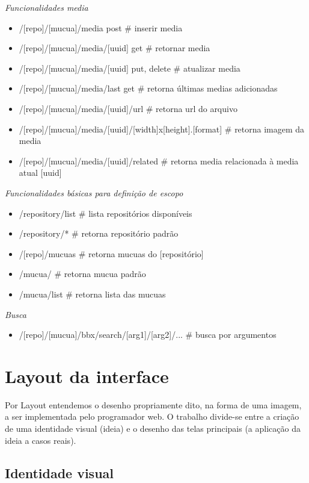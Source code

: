 \begin{itemize}
\emph{Funcionalidades media}
\begin{itemize}
\item /[repo]/[mucua]/media {post}                # inserir media
\item /[repo]/[mucua]/media/[uuid] {get}          # retornar media
\item /[repo]/[mucua]/media/[uuid] {put, delete}  # atualizar media
\item /[repo]/[mucua]/media/last {get}            # retorna últimas medias adicionadas
\item /[repo]/[mucua]/media/[uuid]/url            # retorna url do arquivo
\item /[repo]/[mucua]/media/[uuid]/[width]x[height].[format]       # retorna imagem da media
\item /[repo]/[mucua]/media/[uuid]/related        # retorna media relacionada à media atual [uuid]
\end{itemize}

\emph{Funcionalidades básicas para definição de escopo}
\begin{itemize}
\item /repository/list                     # lista repositórios disponíveis
\item /repository/*                        # retorna repositório padrão
\item /[repo]/mucuas                       # retorna mucuas do [repositório]
\item /mucua/                              # retorna mucua padrão
\item /mucua/list                          # retorna lista das mucuas
\end{itemize}

\emph{Busca}
\begin{itemize}
\item /[repo]/[mucua]/bbx/search/[arg1]/[arg2]/...  # busca por argumentos
\end{itemize}

\section{Layout da interface}
Por Layout entendemos o desenho propriamente dito, na forma de uma
imagem, a ser implementada pelo programador web. O trabalho divide-se
entre a criação de uma identidade visual (ideia) e o desenho das
telas principais (a aplicação da ideia a casos reais).

\subsection{Identidade visual}


\end{itemize}
